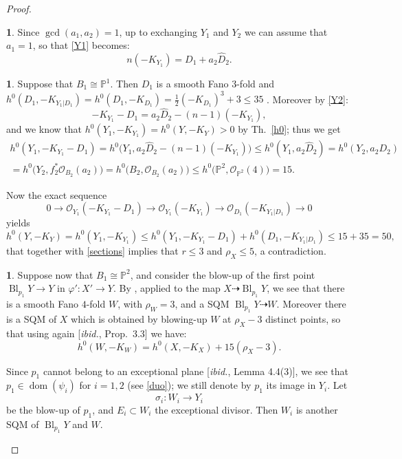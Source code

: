 \documentclass[a4paper,12pt]{amsart}
\theoremstyle{definition}
\newtheorem{prg}[thm]{}
\numberwithin{figure}{section}
\numberwithin{table}{section}
\newcommand{\ph}{\varphi}
\newcommand{\ma}{\mathcal}
\newcommand{\la}{\longrightarrow}
\newcommand{\pr}{\mathbb{P}}
\newcommand{\dom}{\operatorname{dom}}
\newcommand{\Bl}{\operatorname{Bl}}
\begin{document}
\begin{proof}
\begin{prg}
Since $\gcd(a_1,a_2)=1$, 
up to exchanging $Y_1$ and $Y_2$ we can assume that $a_1=1$, so that \eqref{Y1} becomes:
\begin{equation}\label{Y2}
  n(-K_{Y_1})=D_1+a_2\widehat{D}_2.
\end{equation}  
\end{prg}
  \begin{prg}
Suppose that $B_1\cong\pr^1$. Then $D_1$ is a smooth Fano $3$-fold and $h^0(D_1,-K_{Y_1|D_1})=h^0(D_1,-K_{D_1})=\frac{1}{2}(-K_{D_1})^3+3\leq 35$ \cite[Cor.~7.1.2]{fanoEMS}. Moreover by \eqref{Y2}:
$$-K_{Y_1}-D_1=a_2\widehat{D}_2-(n-1)(-K_{Y_1}),$$
and we know that $h^0(Y_1,-K_{Y_1})=h^0(Y,-K_Y)>0$ by Th.~\ref{h0};
thus we get
\begin{gather*}
h^0(Y_1,-K_{Y_1}-D_1)=h^0\bigl(Y_1,a_2\widehat{D}_2-(n-1)(-K_{Y_1})\bigr)\leq 
h^0(Y_1,a_2\widehat{D}_2)
=h^0(Y_2,a_2D_2)\\=h^0\bigl(Y_2,f_2^*\ma{O}_{B_2}(a_2)\bigr)=h^0\bigl(B_2,\ma{O}_{B_2}(a_2)\bigr)\leq
h^0\bigl(\pr^2,\ma{O}_{\pr^2}(4)\bigr)=15.\end{gather*}

Now the exact sequence
$$0\la\ma{O}_{Y_1}(-K_{Y_1}-D_1)\la\ma{O}_{Y_1}(-K_{Y_1})\la\ma{O}_{D_1}(-K_{Y_1|D_1})\la 0$$
yields 
$$h^0(Y,-K_Y)=h^0(Y_1,-K_{Y_1})\leq h^0(Y_1,-K_{Y_1}-D_1)+h^0(D_1,-K_{Y_1|D_1})\leq 15+35=50,$$
that together with \eqref{sections} implies that $r\leq 3$ and $\rho_X\leq 5$, a contradiction.
\end{prg}
  \begin{prg}\label{verylast}
    Suppose now that $B_1\cong\pr^2$, and
consider the blow-up
of the first point
$\Bl_{p_1}Y\to Y$ in $\ph'\colon X'\to Y$. By \cite[Lemma 4.19(1)]{blowup}, applied to the map $X\dasharrow \Bl_{p_1}Y$, we see that there is a smooth Fano $4$-fold $W$, with $\rho_{W}=3$, and a SQM $\Bl_{p_1}Y\dasharrow W$. Moreover there is a SQM of $X$ which is obtained by blowing-up $W$ at $\rho_X-3$ distinct points, so that using again [\emph{ibid.}, Prop.~3.3]
we have:
 \begin{equation}\label{sections2}h^0(W,-K_{W})=h^0(X,-K_X)+15(\rho_X-3).\end{equation}
 
 Since $p_1$ cannot belong to an exceptional plane [\emph{ibid.}, Lemma 4.4(3)], we see that $p_1\in\dom(\psi_i)$ for $i=1,2$ (see \ref{duo}); we still denote by $p_1$ its image in $Y_i$. Let
 $$\sigma_i\colon W_i\la Y_i$$ be the blow-up of $p_1$, and $E_i\subset W_i$ the exceptional divisor.
Then $W_i$ is another SQM of $\Bl_{p_1}Y$ and $W$.


\end{prg}
\end{proof}
\end{document}
